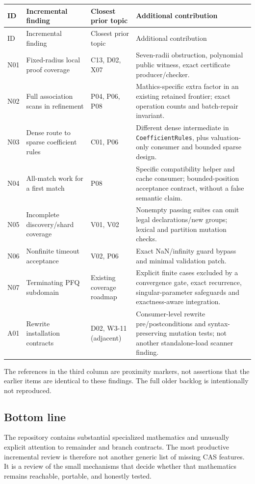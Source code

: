\documentclass[11pt,letterpaper]{article}
\newcommand{\code}[1]{\nolinkurl{#1}}
\begin{document}
\small
\begin{longtable}{P{0.08\textwidth}P{0.29\textwidth}P{0.16\textwidth}P{0.37\textwidth}}
\toprule
ID & Incremental finding & Closest prior topic & Additional contribution\\
\midrule
\endfirsthead
\toprule ID & Incremental finding & Closest prior topic & Additional contribution\\\midrule
\endhead
N01 & Fixed-radius local proof coverage & C13, D02, X07 & Seven-radii obstruction, polynomial public witness, exact certificate producer/checker.\\
N02 & Full association scans in refinement & P04, P06, P08 & Mathics-specific extra factor in an existing retained frontier; exact operation counts and batch-repair invariant.\\
N03 & Dense route to sparse coefficient rules & C01, P06 & Different dense intermediate in \code{CoefficientRules}, plus valuation-only consumer and bounded sparse design.\\
N04 & All-match work for a first match & P08 & Specific compatibility helper and cache consumer; bounded-position acceptance contract, without a false semantic claim.\\
N05 & Incomplete discovery/shard coverage & V01, V02 & Nonempty passing suites can omit legal declarations/new groups; lexical and partition mutation checks.\\
N06 & Nonfinite timeout acceptance & V02, P06 & Exact NaN/infinity guard bypass and minimal validation patch.\\
N07 & Terminating PFQ subdomain & Existing coverage roadmap & Explicit finite cases excluded by a convergence gate, exact recurrence, singular-parameter safeguards and exactness-aware integration.\\
A01 & Rewrite installation contracts & D02, W3-11 (adjacent) & Consumer-level rewrite pre/postconditions and syntax-preserving mutation tests; not another standalone-load scanner finding.\\
\bottomrule
\end{longtable}
\normalsize
The references in the third column are proximity markers, not assertions
that the earlier items are identical to these findings. The full older
backlog is intentionally not reproduced. \cite{review-status,review-wave3}

\subsection{Bottom line}
The repository contains substantial specialized mathematics and unusually
explicit attention to remainder and branch contracts. The most productive
incremental review is therefore not another generic list of missing CAS
features. It is a review of the small mechanisms that decide whether that
mathematics remains reachable, portable, and honestly tested.
\end{document}
